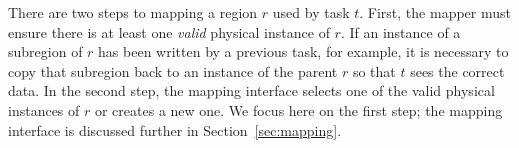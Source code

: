 There are two steps to mapping a region $r$ used by
task $t$.  First, the mapper must ensure there is at least one {\em valid}
physical instance of $r$.  If an instance of a subregion of $r$ has been written by a previous task,
for example, it is necessary to copy that subregion back to an instance of the parent $r$ so that $t$
sees the correct data. In the second step, the mapping interface selects one of the
valid physical instances of $r$ or creates a new one.  
We focus here on the first step; the mapping interface is discussed further in Section~\ref{sec:mapping}.





